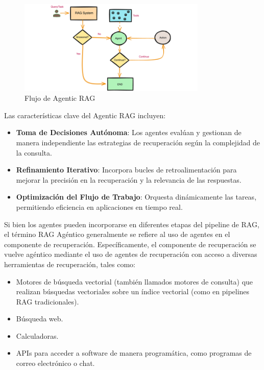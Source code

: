 \begin{figure}[h]
	\centering
	\includegraphics[width=0.8\textwidth]{figs/agentic_rag.png}
	\caption{Flujo de Agentic RAG}
	\label{fig:context-anoni1}
\end{figure}

Las características clave del Agentic RAG incluyen:
\begin{itemize}
    \item \textbf{Toma de Decisiones Autónoma}: Los agentes evalúan y gestionan de manera independiente las estrategias de recuperación según la complejidad de la consulta.
    \item \textbf{Refinamiento Iterativo}: Incorpora bucles de retroalimentación para mejorar la precisión en la recuperación y la relevancia de las respuestas.
    \item \textbf{Optimización del Flujo de Trabajo}: Orquesta dinámicamente las tareas, permitiendo eficiencia en aplicaciones en tiempo real.
\end{itemize}

Si bien los agentes pueden incorporarse en diferentes etapas del pipeline de RAG, el término RAG Agéntico generalmente se refiere al uso de agentes en el componente de recuperación.
Específicamente, el componente de recuperación se vuelve agéntico mediante el uso de agentes de recuperación con acceso a diversas herramientas de recuperación, tales como:

\begin{itemize}
    \item Motores de búsqueda vectorial (también llamados motores de consulta) que realizan búsquedas vectoriales sobre un índice vectorial (como en pipelines RAG tradicionales).
    \item Búsqueda web.
    \item Calculadoras.
    \item APIs para acceder a software de manera programática, como programas de correo electrónico o chat.
\end{itemize}

